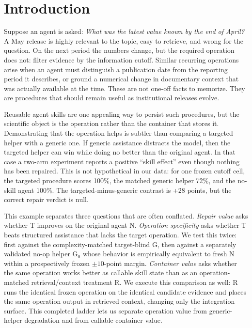 \section{Introduction}
Suppose an agent is asked: \emph{What was the latest value known by the end of April?} A May release is highly relevant to the topic, easy to retrieve, and wrong for the question. On the next period the numbers change, but the required operation does not: filter evidence by the information cutoff. Similar recurring operations arise when an agent must distinguish a publication date from the reporting period it describes, or ground a numerical change in documentary context that was actually available at the time. These are not one-off facts to memorize. They are procedures that should remain useful as institutional releases evolve.

Reusable agent skills are one appealing way to persist such procedures, but the scientific object is the operation rather than the container that stores it. Demonstrating that the operation helps is subtler than comparing a targeted helper with a generic one. If generic assistance distracts the model, then the targeted helper can win while doing no better than the original agent. In that case a two-arm experiment reports a positive ``skill effect'' even though nothing has been repaired. This is not hypothetical in our data: for one frozen cutoff cell, the targeted procedure scores 100\%, the matched generic helper 72\%, and the no-skill agent 100\%. The targeted-minus-generic contrast is +28 points, but the correct repair verdict is null.

This example separates three questions that are often conflated. \emph{Repair value} asks whether T improves on the original agent N. \emph{Operation specificity} asks whether T beats structured assistance that lacks the target operation. We test this twice: first against the complexity-matched target-blind G, then against a separately validated no-op helper G$_0$ whose behavior is empirically equivalent to fresh N within a prospectively frozen $\pm10$-point margin. \emph{Container value} asks whether the same operation works better as callable skill state than as an operation-matched retrieval/context treatment R. We execute this comparison as well: R runs the identical frozen operation on the identical candidate evidence and places the same operation output in retrieved context, changing only the integration surface. This completed ladder lets us separate operation value from generic-helper degradation and from callable-container value.

